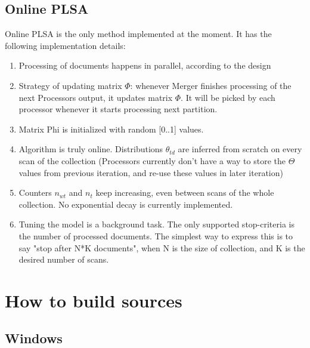 \documentclass[11pt,a4paper,twoside]{report}
\begin{document}
\subsection{Online PLSA}
Online PLSA is the only method implemented at the moment.
It has the following implementation details:
\begin{enumerate}
    \item Processing of documents happens in parallel, according to the design
    \item Strategy of updating matrix $\Phi$: whenever Merger finishes processing of the next Processors output,
    it updates matrix $\Phi$. It will be picked by each processor whenever it starts processing next partition.
    \item Matrix Phi is initialized with random [0..1] values.
    \item Algorithm is truly online. Distributions $\theta_{t d}$ are inferred from scratch on every scan of the collection (Processors currently don't have a way to store the $\Theta$ values from previous iteration,
        and re-use these values in later iteration)
    \item Counters $n_{w t}$ and $n_t$ keep increasing, even between scans of the whole collection.
    No exponential decay is currently implemented.
    \item Tuning the model is a background task. The only supported stop-criteria is the number of processed documents. The simplest way to express this is to say "stop after N*K documents", when N is the size of collection,
        and K is the desired number of scans.
\end{enumerate}

\section{How to build sources}

\subsection{Windows}
\end{document}
